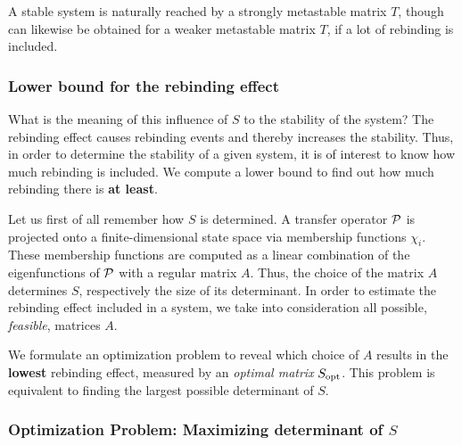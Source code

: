 A stable system is naturally reached by a strongly metastable matrix $T$, though can likewise be obtained for a weaker metastable matrix $T$, if a lot of rebinding is included.

\subsubsection*{Lower bound for the rebinding effect}

What is the meaning of this influence of $S$ to the stability of the system?
The rebinding effect causes rebinding events and thereby increases the stability.
Thus, in order to determine the stability of a given system, it is of interest to know how much rebinding is included.
We compute a lower bound to find out how much rebinding there is \textbf{at least}.

Let us first of all remember how $S$ is determined. A transfer operator $\mathcal{P}$ is projected onto a finite-dimensional state space via membership functions $\chi_i$. These membership functions are computed as a linear combination of the eigenfunctions of $\mathcal{P}$ with a regular matrix $A$. Thus, the choice of the matrix $A$ determines $S$, respectively the size of its determinant. %
In order to estimate the rebinding effect included in a system, we take into consideration all possible, \textit{feasible}, matrices $A$.

We formulate an optimization problem to reveal which choice of $A$ results in the \textbf{lowest} rebinding effect, measured by an \textit{optimal matrix} $S_{\mathrm{opt}}$.
This problem is equivalent to finding the largest possible determinant of $S$.

\subsubsection*{Optimization Problem: Maximizing determinant of $S$}


